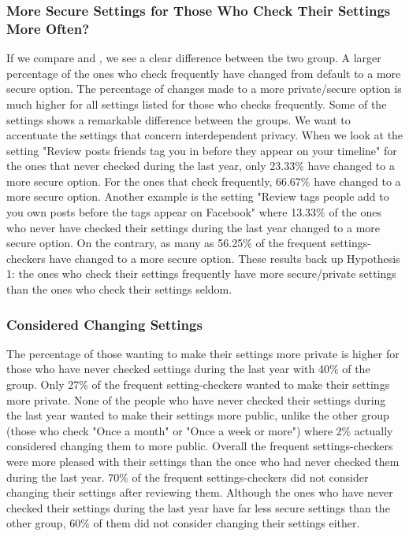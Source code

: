 \subsubsection{More Secure Settings for Those Who Check Their Settings More Often?}
If we compare  and , we see a clear difference between the two group. A larger percentage of the ones who check frequently have changed from default to a more secure option. The percentage of changes made to a more private/secure option is much higher for all settings listed for those who checks frequently. Some of the settings shows a remarkable difference between the groups. We want to accentuate the settings that concern interdependent privacy. When we look at the setting "Review posts friends tag you in before they appear on your timeline" for the ones that never checked during the last year, only 23.33\% have changed to a more secure option. For the ones that check frequently, 66.67\% have changed to a more secure option. Another example is the setting "Review tags people add to you own posts before the tags appear on Facebook" where 13.33\% of the ones who never have checked their settings during the last year changed to a more secure option. On the contrary, as many as 56.25\% of the frequent settings-checkers have changed to a more secure option. These results back up Hypothesis 1: the ones who check their settings frequently have more secure/private settings than the ones who check their settings seldom. 

\subsubsection{Considered Changing Settings}
The percentage of those wanting to make their settings more private is higher for those who have never checked settings during the last year with 40\% of the group. Only 27\% of the frequent setting-checkers wanted to make their settings more private. 
None of the people who have never checked their settings during the last year wanted to make their settings more public, unlike the other group (those who check "Once a month" or "Once a week or more") where 2\% actually considered changing them to more public. Overall the frequent settings-checkers were more pleased with their settings than the once who had never checked them during the last year. 70\% of the frequent settings-checkers did not consider changing their settings after reviewing them. Although the ones who have never checked their settings during the last year have far less secure settings than the other group, 60\% of them did not consider changing their settings either. 


